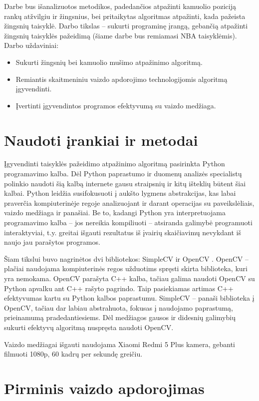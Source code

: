 \documentclass{VUMIFPSkursinis}
\begin{document}
Darbe bus išanalizuotos metodikos, padedančios atpažinti kamuolio poziciją rankų atžvilgiu ir žingsnius, bei pritaikytas algoritmas atpažinti, kada pažeista žingsnių taisyklė. Darbo tikslas – sukurti programinę įrangą, gebančią atpažinti žingsnių taisyklės pažeidimą (šiame darbe bus remiamasi NBA taisyklėmis). Darbo uždaviniai:
\begin{itemize}[topsep=5pt,itemsep=-1ex,partopsep=2ex,parsep=2ex]
 \item Sukurti žingsnių bei kamuolio mušimo atpažinimo algoritmą.
 \item Remiantis skaitmeniniu vaizdo apdorojimo technologijomis algoritmą įgyvendinti.
 \item Įvertinti įgyvendintos programos efektyvumą su vaizdo medžiaga.
\end{itemize}

\section{Naudoti įrankiai ir metodai}
Įgyvendinti taisyklės pažeidimo atpažinimo algoritmą pasirinkta Python programavimo kalba. Dėl Python paprastumo ir duomenų analizės specialistų polinkio naudoti šią kalbą internete gausu straipsnių ir kitų išteklių būtent šiai kalbai. Python leidžia susifokusuoti į aukšto lygmens abstrakcijas, kas labai praverčia kompiuterinėje regoje analizuojant ir darant operacijas su paveikslėliais, vaizdo medžiaga ir panašiai. Be to, kadangi Python yra interpretuojama programavimo kalba – jos nereikia kompiliuoti – atsiranda galimybė programuoti interaktyviai, t.y. greitai išgauti rezultatus iš įvairių skaičiavimų nevykdant iš naujo jau parašytos programos. 

Šiam tikslui buvo nagrinėtos dvi bibliotekos: SimpleCV \cite{SimpleCV} ir OpenCV \cite{OpenCV}. OpenCV – plačiai naudojama kompiuterinės regos užduotims spręsti skirta biblioteka, kuri yra nemokama. OpenCV parašyta C++ kalba, tačiau galima naudoti OpenCV su  Python apvalku ant C++ rašyto pagrindo. Taip pasiekiamas artimas C++ efektyvumas kartu su Python kalbos paprastumu.
SimpleCV – panaši biblioteka į OpenCV, tačiau dar labiau abstrahuota, fokusas į naudojamo paprastumą, prieinamumą pradedantiesiems. Dėl medžiagos gausos ir didesnių galimybių sukurti efektyvų algoritmą nuspręsta naudoti OpenCV.

Vaizdo medžiagai išgauti naudojama Xiaomi Redmi 5 Plus kamera, gebanti filmuoti 1080p, 60 kadrų per sekundę greičiu. 
\section{Pirminis vaizdo apdorojimas}
\end{document}
